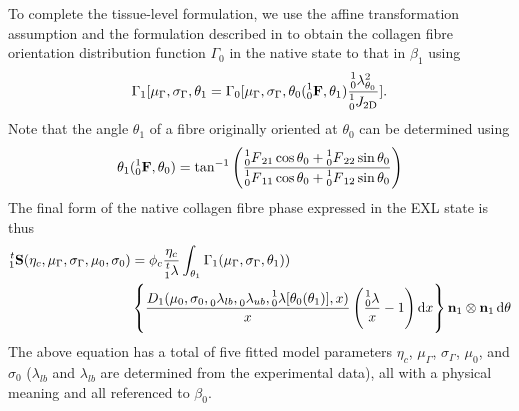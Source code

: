     To complete the tissue-level formulation, we use the affine transformation assumption and the formulation described in \cite{fan_simulation_2014} to obtain the collagen fibre orientation distribution function $\Gamma_0$ in the native state to that in $\beta_1$ using
        \begin{equation}\label{c3:eqn:45}
        \begin{aligned}
        \Gamma_1[\mu_\Gamma,\sigma_\Gamma, \theta_1 = \Gamma_0[\mu_\Gamma, \sigma_\Gamma, \theta_0(\prescript{1}{0}{\mathbf{F}},\theta_1)\frac{\prescript{1}{0}{\lambda}_{\theta_0}^2}{\prescript{1}{0}{J_\mathrm{2D}}}].
        \end{aligned}
        \end{equation}
    Note that the angle $\theta_1$ of a fibre originally oriented at $\theta_0$ can be determined using
        \begin{equation}\label{c3:eqn:46}
        \begin{aligned}
        \theta_1(\prescript{1}{0}{\mathbf{F}},\theta_0) = \tan^{-1}\left(\frac{\prescript{1}{0}{F}_{21}\cos{\theta_0} + \prescript{1}{0}{F}_{22}\sin{\theta_0}}{\prescript{1}{0}{F}_{11}\cos{\theta_0} + \prescript{1}{0}{F}_{12}\sin{\theta_0}}\right)
        \end{aligned}
        \end{equation}
    The final form of the native collagen fibre phase expressed in the EXL state is thus
        \begin{equation}\label{c3:eqn:47}
        \begin{aligned}
        \prescript{t}{1}{\mathbf{S}}(\eta_c, \mu_\Gamma, \sigma_\Gamma, \mu_0, \sigma_0)& = \phi_c\frac{\eta_c}{\prescript{t}{1}{\lambda}} \int_{\theta_1} \Gamma_1(\mu_\Gamma, \sigma_\Gamma,\theta_1))
        \\
        &\left\{ \frac{D_1(\mu_0, \sigma_0, \prescript{}{0}{\lambda}_{lb}, \prescript{}{0}{\lambda}_{ub},\prescript{1}{0}{\lambda}[\theta_0(\theta_1)],x)}{x}\left(\frac{\prescript{1}{0}{\lambda}}{x} - 1\right)\dif x\right\}\mathbf{n}_1\otimes\mathbf{n}_1 \dif \theta
        \end{aligned}
        \end{equation}
    The above equation has a total of five fitted model parameters $\eta_c$, $\mu_\Gamma$, $\sigma_\Gamma$, $\mu_0$, and $\sigma_0$ ($\lambda_{lb}$ and $\lambda_{lb}$ are determined from the experimental data), all with a physical meaning and all referenced to $\beta_0$.


